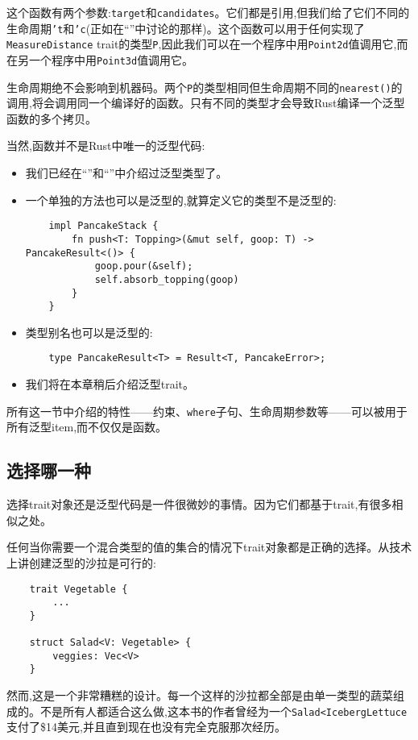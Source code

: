 这个函数有两个参数:\texttt{target}和\texttt{candidates}。它们都是引用,但我们给了它们不同的生命周期\texttt{'t}和\texttt{'c}(正如在“”中讨论的那样)。这个函数可以用于任何实现了\texttt{MeasureDistance} trait的类型\texttt{P},因此我们可以在一个程序中用\texttt{Point2d}值调用它,而在另一个程序中用\texttt{Point3d}值调用它。

生命周期绝不会影响到机器码。两个\texttt{P}的类型相同但生命周期不同的\texttt{nearest()}的调用,将会调用同一个编译好的函数。只有不同的类型才会导致Rust编译一个泛型函数的多个拷贝。

当然,函数并不是Rust中唯一的泛型代码:
\begin{itemize}
    \item 我们已经在“”和“”中介绍过泛型类型了。
    \item 一个单独的方法也可以是泛型的,就算定义它的类型不是泛型的:
    \begin{verbatim}
    impl PancakeStack {
        fn push<T: Topping>(&mut self, goop: T) -> PancakeResult<()> {
            goop.pour(&self);
            self.absorb_topping(goop)
        }
    }
    \end{verbatim}
    \item 类型别名也可以是泛型的:
    \begin{verbatim}
    type PancakeResult<T> = Result<T, PancakeError>;
    \end{verbatim}
    \item 我们将在本章稍后介绍泛型trait。
\end{itemize}

所有这一节中介绍的特性——约束、\texttt{where}子句、生命周期参数等——可以被用于所有泛型item,而不仅仅是函数。

\subsection{选择哪一种}\label{WhichToUse}
选择trait对象还是泛型代码是一件很微妙的事情。因为它们都基于trait,有很多相似之处。

任何当你需要一个混合类型的值的集合的情况下trait对象都是正确的选择。从技术上讲创建泛型的沙拉是可行的:
\begin{verbatim}
    trait Vegetable {
        ...
    }

    struct Salad<V: Vegetable> {
        veggies: Vec<V>
    }
\end{verbatim}

然而,这是一个非常糟糕的设计。每一个这样的沙拉都全部是由单一类型的蔬菜组成的。不是所有人都适合这么做,这本书的作者曾经为一个\texttt{Salad<IcebergLettuce}支付了\$14美元,并且直到现在也没有完全克服那次经历。

